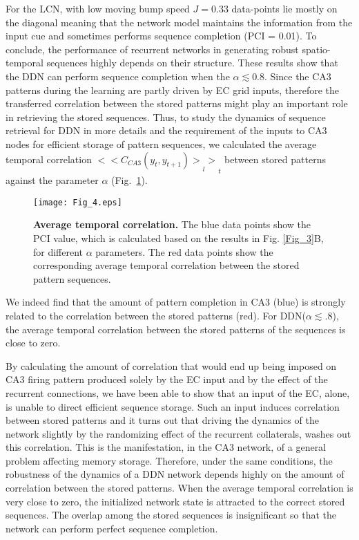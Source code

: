 \documentclass[utf8]{frontiersSCNS} %
\begin{document}
%
For the LCN, with low moving bump speed $J = 0.33$ data-points lie mostly on the diagonal meaning that the network model maintains the information from the input cue and sometimes performs sequence completion (PCI = 0.01). 
%
To conclude, the performance of recurrent networks in generating robust spatio-temporal sequences highly depends on their structure. These results show that the DDN can perform sequence completion when the $\alpha \lesssim 0.8$. Since the CA3 patterns during the learning are partly driven by EC grid inputs, therefore the transferred correlation between the stored patterns might play an important role in retrieving the stored sequences. 
Thus, to study the dynamics of sequence retrieval for DDN in more details and the requirement of the inputs to CA3 nodes for efficient storage of pattern sequences, we calculated the average temporal correlation $ {<{<C_{CA3}(y_t, y_{t+1})>}_l>}_t $ between stored patterns against the parameter $\alpha$ (Fig.~\ref{Fig_4}).   

\begin{figure}[!htb]
\centering\texttt{[image: Fig\_4.eps]}
\caption{\textbf{Average temporal correlation.} 
The blue data points show the PCI value, which is calculated based on the results in Fig. \ref{Fig_3}B, for different $\alpha$ parameters. The red data points show the corresponding average temporal correlation between the stored pattern sequences.
}
\label{Fig_4}
\end{figure}
We indeed find that the amount of pattern completion in CA3 (blue) is strongly related to the correlation between the stored patterns (red). 
For DDN($\alpha \lesssim .8$), the average temporal correlation between the stored patterns of the sequences is close to zero. 

By calculating the amount of correlation that would end up being imposed on CA3 firing pattern produced solely by the EC input and by the effect of the recurrent connections, we have been able to show that an input of the EC, alone, is unable to direct efficient sequence storage. Such an input induces correlation between stored patterns and it turns out that driving the dynamics of the network slightly by the randomizing effect of the recurrent collaterals, washes out this correlation. This is the manifestation, in the CA3 network, of a general problem affecting memory storage. 
Therefore, under the same conditions, the robustness of the dynamics of a DDN network depends highly on the amount of correlation between the stored patterns. When the average temporal correlation is very close to zero, the initialized network state is attracted to the correct stored sequences. The overlap among the stored sequences is insignificant so that the network can perform perfect sequence completion.
\end{document}
